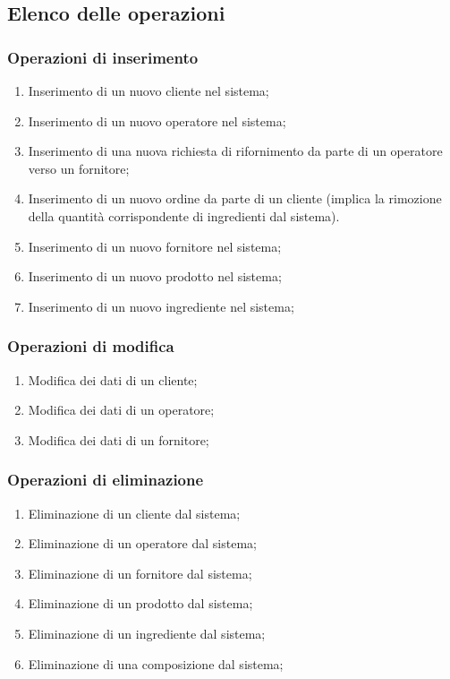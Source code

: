 \documentclass[12pt,a4paper]{article}
\begin{document}
    \subsection{Elenco delle operazioni}
    \subsubsection{Operazioni di inserimento}
    \begin{enumerate}[leftmargin=2.8em,label=\textbf{Op.\arabic*}]
        \item Inserimento di un nuovo cliente nel sistema;
        \item Inserimento di un nuovo operatore nel sistema;
        \item Inserimento di una nuova richiesta di rifornimento da parte di un operatore verso un fornitore;
        \item Inserimento di un nuovo ordine da parte di un cliente (implica la rimozione della quantità corrispondente di ingredienti dal sistema).
        \item Inserimento di un nuovo fornitore nel sistema;
        \item Inserimento di un nuovo prodotto nel sistema;
        \item Inserimento di un nuovo ingrediente nel sistema;
    \end{enumerate}

    \subsubsection{Operazioni di modifica}
    \begin{enumerate}[leftmargin=2.8em,label=\textbf{Op.\arabic*}]
        \item Modifica dei dati di un cliente;
        \item Modifica dei dati di un operatore;
        \item Modifica dei dati di un fornitore;
    \end{enumerate}

    \subsubsection{Operazioni di eliminazione}
    \begin{enumerate}[leftmargin=2.8em,label=\textbf{Op.\arabic*}]
        \item Eliminazione di un cliente dal sistema;
        \item Eliminazione di un operatore dal sistema;
        \item Eliminazione di un fornitore dal sistema;
        \item Eliminazione di un prodotto dal sistema;
        \item Eliminazione di un ingrediente dal sistema;
        \item Eliminazione di una composizione dal sistema;
    \end{enumerate}
\end{document}

